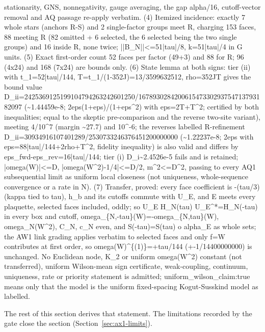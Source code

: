 \begin{gatequote}
stationarity, GNS, nonnegativity, gauge averaging, the gap alpha/16,
cutoff-vector removal and AQ passage re-apply verbatim. (4) Itemized
incidence: exactly 7 whole stars (anchors R-S) and 2 single-factor groups meet
R, charging 153 faces, 88 meeting R (82 omitted + 6 selected, the 6 selected
being the two single groups) and 16 inside R, none twice; ||B\_N||<=51|tau|/8,
k\textquotesingle{}=51|tau|/4 in G units. (5) Exact first-order count 52 faces
per factor (49+3) and 88 for R; 96 (4x24) and 168 (7x24) are bounds only. (6)
State lemma at both signs: tier (ii) with t\_1\textquotesingle{}=52|tau|/144,
T\textquotesingle{}=t\_1\textquotesingle{}/(1-352J\textquotesingle{})=13/3599632512,
rho\textquotesingle{}=352J\textquotesingle{}T\textquotesingle{} gives the
bound value
D\textquotesingle{}\_ii=2425369125199104794263242601250/167893028420061547330293754713793182097
(\textasciitilde{}1.44459e-8; 2eps(1+eps)/(1+eps\textasciicircum{}2) with
eps=2T\textquotesingle{}+T\textquotesingle{}\textasciicircum{}2; certified by
both inequalities; equal to the skeptic pre-comparison and the reverse
two-site variant), meeting 4/10\textasciicircum{}7 (margin
\textasciitilde{}27.7) and 10\textasciicircum{}-6; the
reverse\textquotesingle{}s labelled R-refinement
D\textquotesingle{}\_ii=30934916107401289/2530733246376451200000000
(\textasciitilde{}1.22237e-8; 2eps with
eps=88|tau|/144+2rho\textquotesingle{}+T\textquotesingle{}\textasciicircum{}2,
fidelity inequality) is also valid and differs by
eps\_fwd-eps\_rev=16|tau|/144; tier (i)
D\textquotesingle{}\_i\textasciitilde{}2.4526e-5 fails and is retained;
|omega(W)|<=D\textquotesingle{},
|omega(W\textasciicircum{}2)-1/4|<=D\textquotesingle{}/2,
m\textasciicircum{}2<=D\textquotesingle{}\textasciicircum{}2, passing to every
AQ1 subsequential limit as uniform local closeness (not uniqueness,
whole-sequence convergence or a rate in N). (7) Transfer, proved: every face
coefficient is -(tau/3) (kappa tied to tau), h\_b and its cutoffs commute with
U\_E, and E meets every plaquette, selected faces included, oddly; so U\_E
H\_N(tau) U\_E\textasciicircum{}*=H\_N(-tau) in every box and cutoff,
omega\_\{N,-tau\}(W)=-omega\_\{N,tau\}(W), omega\_N(W\textasciicircum{}2),
C\_N, c\_N even, and S(-tau)=S(tau) o alpha\_E as whole sets; the AW1 link
grading applies verbatim to selected faces and only f=W contributes at first
order, so omega(W)\textasciicircum{}\{(1)\}=+tau/144 (+-1/14400000000) is
unchanged. No Euclidean node, K\_2 or uniform omega(W\textasciicircum{}2)
constant (not transferred), uniform Wilson-mean sign certificate,
weak-coupling, continuum, uniqueness, rate or priority statement is admitted;
uniform\_wilson\_claim:true means only that the model is the uniform
fixed-spacing Kogut-Susskind model as labelled.
\end{gatequote}
The rest of this section derives that statement. The limitations recorded by
the gate close the section (Section~\ref{sec:ax1-limits}).

